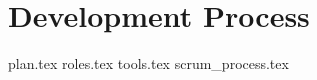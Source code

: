 \chapter{Development Process}
\label{chap:process}

{plan.tex}
{roles.tex}
{tools.tex}
{scrum_process.tex}
